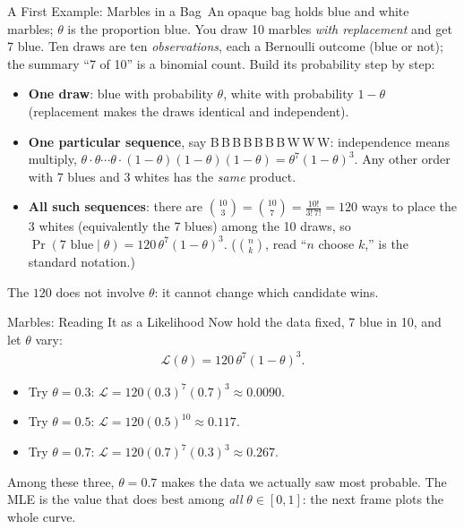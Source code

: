 \documentclass[aspectratio=169,11pt,xcolor=dvipsnames]{beamer}
\newcommand{\lik}{\mathcal{L}}
\newcommand{\core}{\,\raisebox{0.6pt}{\textcolor{corestar}{$\bigstar$}}}
\begin{document}
\begin{frame}{A First Example: Marbles in a Bag\core}
An opaque bag holds blue and white marbles; $\theta$ is the proportion blue.
You draw 10 marbles \emph{with replacement} and get 7 blue. Ten draws are
ten \emph{observations}, each a Bernoulli outcome (blue or not); the
summary ``7 of 10'' is a binomial count. Build its probability step by step:
\begin{itemize}\itemsep2pt
  \item \textbf{One draw}: blue with probability $\theta$, white with
        probability $1-\theta$ (replacement makes the draws identical and
        independent).
  \item \textbf{One particular sequence}, say B\,B\,B\,B\,B\,B\,B\,W\,W\,W:
        independence means multiply,
        $\theta\cdot\theta\cdots\theta\cdot(1-\theta)(1-\theta)(1-\theta)
        = \theta^{7}(1-\theta)^{3}$. Any other order with 7 blues and 3
        whites has the \emph{same} product.
  \item \textbf{All such sequences}: there are
        $\binom{10}{3} = \binom{10}{7} = \frac{10!}{3!\,7!} = 120$ ways to
        place the 3 whites (equivalently the 7 blues) among the 10 draws,
        so $\Pr(7 \text{ blue} \mid \theta) = 120\,\theta^{7}(1-\theta)^{3}$.
        ($\binom{n}{k}$, read ``$n$ choose $k$,'' is the standard notation.)
\end{itemize}
The $120$ does not involve $\theta$: it cannot change which candidate wins.
\end{frame}

\begin{frame}{Marbles: Reading It as a Likelihood}
Now hold the data fixed, 7 blue in 10, and let $\theta$ vary:
\begin{align*}
  \lik(\theta) = 120\,\theta^{7}(1-\theta)^{3} .
\end{align*}
\begin{itemize}\itemsep3pt
  \item Try $\theta = 0.3$: $\lik = 120(0.3)^7(0.7)^3 \approx 0.0090$.
  \item Try $\theta = 0.5$: $\lik = 120(0.5)^{10} \approx 0.117$.
  \item Try $\theta = 0.7$: $\lik = 120(0.7)^7(0.3)^3 \approx 0.267$.
\end{itemize}
\vskip3pt
Among these three, $\theta = 0.7$ makes the data we actually saw most
probable. The MLE is the value that does best among \emph{all}
$\theta\in[0,1]$: the next frame plots the whole curve.
\end{frame}
\end{document}
